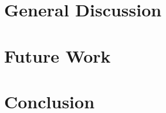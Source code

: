 \documentclass[10pt,letterpaper]{article}
\begin{document}
\section{General Discussion}

\section{Future Work}

\section{Conclusion}





\setlength{\bibleftmargin}{.125in}
\setlength{\bibindent}{-\bibleftmargin}


\end{document}
